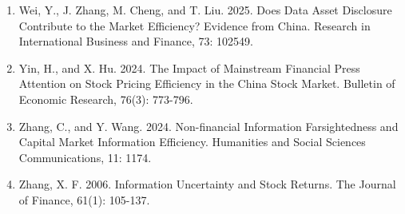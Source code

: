 \begin{enumerate}
\item
  Wei, Y., J. Zhang, M. Cheng, and T. Liu. 2025. Does Data Asset Disclosure Contribute to the Market Efficiency? Evidence from China. Research in International Business and Finance, 73: 102549.
\item
  Yin, H., and X. Hu. 2024. The Impact of Mainstream Financial Press Attention on Stock Pricing Efficiency in the China Stock Market. Bulletin of Economic Research, 76(3): 773-796.
\item
  Zhang, C., and Y. Wang. 2024. Non-financial Information Farsightedness and Capital Market Information Efficiency. Humanities and Social Sciences Communications, 11: 1174.
\item
  Zhang, X. F. 2006. Information Uncertainty and Stock Returns. The Journal of Finance, 61(1): 105-137.
\end{enumerate}
